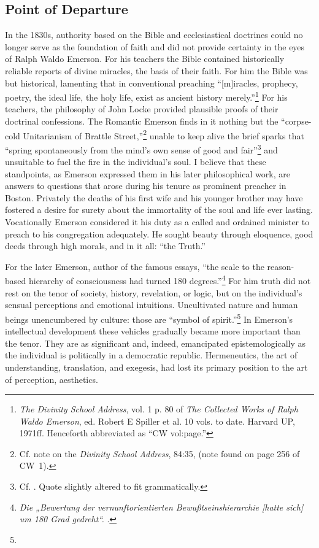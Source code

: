\documentclass[a4paper,12pt,english]{article}
\newcommand{\de}[1]{{\it\foreignlanguage{german}{#1}}\xspace}
\begin{document}
\subsection*{Point of Departure}
In the 1830s, authority based on the Bible and ecclesiastical doctrines could no longer serve as the foundation of faith and did not provide certainty in the eyes of Ralph Waldo Emerson. For his teachers the Bible contained historically reliable reports of divine miracles, the basis of their faith. For him the Bible was but historical, lamenting that in conventional preaching “[m]iracles, prophecy, poetry, the ideal life, the holy life, exist as ancient history merely.”\footnote{{\it The Divinity School Address}, vol. 1 p. 80 of {\it The Collected Works of Ralph Waldo Emerson}, ed. Robert E Spiller et al. 10 vols. to date. Harvard UP, 1971ff. Henceforth abbreviated as “CW vol:page.”} For his teachers, the philosophy of John Locke provided plausible proofs of their doctrinal confessions. The Romantic Emerson finds in it nothing but the “corpse-cold Unitarianism of Brattle Street,”\footnote{Cf. note on the {\it Divinity School Address}, 84:35, (note found on page 256 of CW 1).} unable to keep alive the brief sparks that “spring spontaneously from the mind’s own sense of good and fair”\footnote{Cf. . Quote slightly altered to fit grammatically.} and unsuitable to fuel the fire in the individual’s soul. I believe that these standpoints, as Emerson expressed them in his later philosophical work, are answers to questions that arose during his tenure as prominent preacher in Boston. Privately the deaths of his first wife and his younger brother may have fostered a desire for surety about the immortality of the soul and life ever lasting. Vocationally Emerson considered it his duty as a called and ordained minister to preach to his congregation adequately. He sought beauty through eloquence, good deeds through high morals, and in it all: “the Truth.”

For the later Emerson, author of the famous essays, “the scale to the reason-based hierarchy of consciousness had turned 180 degrees.”\footnote{\de{Die „Bewertung der vernunftorientierten Bewußtseinshierarchie [hatte sich] um 180 Grad gedreht“.} \cite[106]{Peper}.} For him truth did not rest on the tenor of society, history, revelation, or logic, but on the individual’s sensual perceptions and emotional intuitions. Uncultivated nature and human beings unencumbered by culture: those are “symbol of spirit.”\footnote{} In Emerson’s intellectual development these vehicles gradually became more important than the tenor. They are as significant and, indeed, emancipated epistemologically as the individual is politically in a democratic republic. Hermeneutics, the art of understanding, translation, and exegesis, had lost its primary position to the art of perception, aesthetics.
\end{document}
